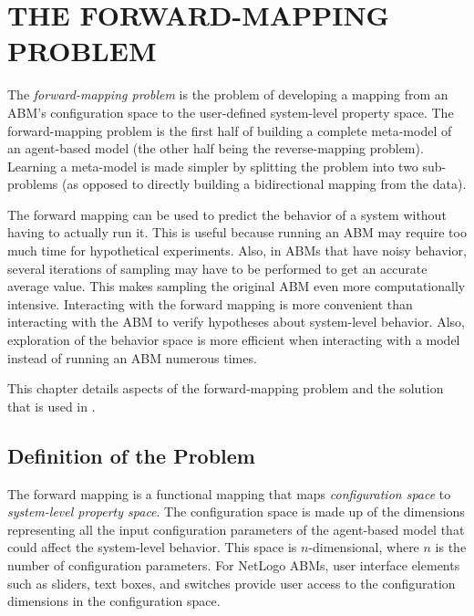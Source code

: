\chapter{THE FORWARD-MAPPING PROBLEM}
\thispagestyle{plain}

\label{ForwardMapping}

The \textit{forward-mapping problem} is the problem of developing a mapping from an ABM's configuration space to the user-defined system-level property space.
The forward-mapping problem is the first half of building a complete meta-model of an agent-based model (the other half being the reverse-mapping problem).
Learning a meta-model is made simpler by splitting the problem into two sub-problems (as opposed to directly building a bidirectional mapping from the data).

The forward mapping can be used to predict the behavior of a system without having to actually run it.
This is useful because running an ABM may require too much time for hypothetical experiments.
Also, in ABMs that have noisy behavior, several iterations of sampling may have to be performed to get an accurate average value.
This makes sampling the original ABM even more computationally intensive.
Interacting with the forward mapping is more convenient than interacting with the ABM to verify hypotheses about system-level behavior.
Also, exploration of the behavior space is more efficient when interacting with a model instead of running an ABM numerous times.


This chapter details aspects of the forward-mapping problem and the solution that is used in \fw.

\section{Definition of the Problem}
The forward mapping is a functional mapping that maps \textit{configuration space} to \textit{system-level property space}.
The configuration space is made up of the dimensions representing all the input configuration parameters of the agent-based model that could affect the system-level behavior.
This space is $n$-dimensional, where $n$ is the number of configuration parameters.
For NetLogo ABMs, user interface elements such as sliders, text boxes, and switches provide user access to the configuration dimensions in the configuration space.

